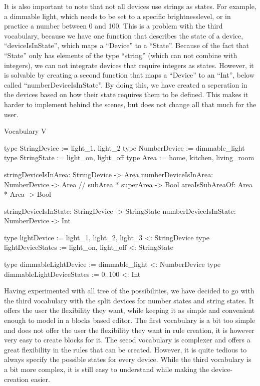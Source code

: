 \documentclass[11pt,a4paper]{report}
\begin{document}
It is also important to note that not all devices use strings as states. For example, a dimmable light, which needs to be set to a specific brightnesslevel, or in practice a number between 0 and 100. This is a problem with the third vocabulary, because we have one function that describes the state of a device, ``deviceIsInState'', which maps a ``Device'' to a ``State''. Because of the fact that ``State'' only has elements of the type ``string'' (which can not combine with integers), we can not integrate devices that require integers as states. However, it is solvable by creating a second function that maps a ``Device'' to an ``Int'', below called ``numberDeviceIsInState''. By doing this, we have created a seperation in the devices based on how their state requires them to be defined. This makes it harder to implement behind the scenes, but does not change all that much for the user.

\begin{idplisting}
Vocabulary V {
	type StringDevice := {light_1, light_2}
	type NumberDevice := {dimmable_light}
	type StringState := {light_on, light_off}
	type Area := {home, kitchen, living_room}

	stringDeviceIsInArea: StringDevice -> Area
	numberDeviceIsInArea: NumberDevice -> Area
	// subArea * superArea -> Bool
	areaIsSubAreaOf: Area * Area -> Bool

	stringDeviceIsInState: StringDevice -> StringState
	numberDeviceIsInState: NumberDevice -> Int

	type lightDevice := {light_1, light_2, light_3} <: StringDevice
	type lightDeviceStates := {light_on, light_off} <: StringState

    type dimmableLightDevice := {dimmable_light} <: NumberDevice
    type dimmableLightDeviceStates := {0..100} <: Int
}
\end{idplisting}

Having experimented with all tree of the possibilities, we have decided to go with the third vocabulary with the split devices for number states and string states. It offers the user the flexibility they want, while keeping it as simple and convenient enough to model in a blocks based editor. The first vocabulary is a bit too simple and does not offer the user the flexibility they want in rule creation, it is however very easy to create blocks for it. The secod vocabulary is complexer and offers a great flexibility in the rules that can be created. However, it is quite tedious to always specify the possible states for every device. While the third vocabulary is a bit more complex, it is still easy to understand while making the device-creation easier.
\end{document}
